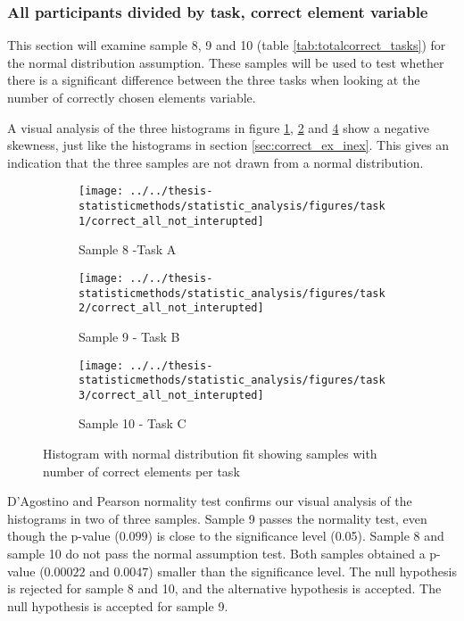  \subsubsection[Sample 8, 9 and 10]{All participants divided by task,  correct element variable}\label{sec:task123_correct_normaltest}
This section will examine sample 8, 9 and 10 (table \ref{tab:totalcorrect_tasks}) for the normal distribution assumption. These samples will be used to test whether there is a significant difference between the three tasks when looking at the number of correctly chosen elements variable. 

A visual analysis of the three histograms in figure \ref{fig:correctallnotinterupted_task1}, \ref{fig:correctallnotinterupted_task2} and \ref{fig:correctallnotinterupted_task3} show a negative skewness, just like the histograms in section \ref{sec:correct_ex_inex}. This gives an indication that the three samples are not drawn from a normal distribution.
 
 \begin{figure}[H]
 	\centering
	 \begin{subfigure}[b]{0.32\linewidth}
	 	\centering
	 	\texttt{[image: ../../thesis-statisticmethods/statistic\_analysis/figures/task1/correct\_all\_not\_interupted]}
	 	\caption{Sample 8 -Task A}
	 	\label{fig:correctallnotinterupted_task1}
	 \end{subfigure}
	\begin{subfigure}[b]{0.32\linewidth}
		\centering
		\texttt{[image: ../../thesis-statisticmethods/statistic\_analysis/figures/task2/correct\_all\_not\_interupted]}
		\caption{Sample 9 - Task B}
		\label{fig:correctallnotinterupted_task2}
	\end{subfigure}
	 \begin{subfigure}[b]{0.32\linewidth}
	 	\centering
	 	\texttt{[image: ../../thesis-statisticmethods/statistic\_analysis/figures/task3/correct\_all\_not\_interupted]}
	 	\caption{Sample 10 - Task C}
	 	\label{fig:correctallnotinterupted_task3}
	 \end{subfigure}
 \caption{Histogram with normal distribution fit showing samples with number of correct elements per task}
 \end{figure}
 D'Agostino and Pearson normality test confirms our visual analysis of the histograms in two of three samples. Sample 9 passes the normality test, even though the p-value ($0.099$) is close to the significance level (0.05). Sample 8 and sample 10 do not pass the normal assumption test. Both samples obtained a p-value ($0.00022$ and $0.0047$) smaller than the significance level. The null hypothesis is rejected for sample 8 and 10, and the alternative hypothesis is accepted. The null hypothesis is accepted for sample 9. 

